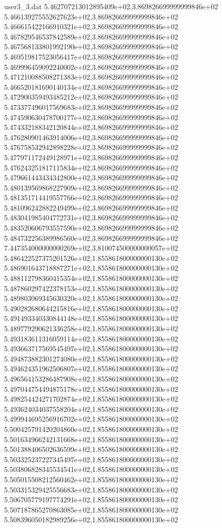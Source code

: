 \begin{filecontents}{user3_3.dat}
5.462707213012895409e+02,3.869826699999999846e+02
5.466139275552627623e+02,3.869826699999999846e+02
5.466615422166910321e+02,3.869826699999999846e+02
5.467829546537842589e+02,3.869826699999999846e+02
5.467568133801992190e+02,3.869826699999999846e+02
5.469519817523056417e+02,3.869826699999999846e+02
5.469996459092240002e+02,3.869826699999999846e+02
5.471210088508271383e+02,3.869826699999999846e+02
5.466520181690140134e+02,3.869826699999999846e+02
5.472900359493485212e+02,3.869826699999999846e+02
5.473377496017569683e+02,3.869826699999999846e+02
5.474590630478700177e+02,3.869826699999999846e+02
5.474332188342120844e+02,3.869826699999999846e+02
5.476280901463914006e+02,3.869826699999999846e+02
5.476758532942898228e+02,3.869826699999999846e+02
5.477971172449128971e+02,3.869826699999999846e+02
5.476243251817115834e+02,3.869826699999999846e+02
5.479661443434342800e+02,3.869826699999999846e+02
5.480139569868227909e+02,3.869826699999999846e+02
5.481351714419557766e+02,3.869826699999999846e+02
5.481096242882249499e+02,3.869826699999999846e+02
5.483041985404772731e+02,3.869826699999999846e+02
5.483520606793557590e+02,3.869826699999999846e+02
5.484732256389986560e+02,3.869826699999999846e+02
7.447354000000000269e+02,3.810074500000000057e+02
5.486422527375201526e+02,1.855861800000000130e+02
5.486901643718887271e+02,1.855861800000000130e+02
5.488112798360415354e+02,1.855861800000000130e+02
5.487860297422378153e+02,1.855861800000000130e+02
5.489803069345630320e+02,1.855861800000000130e+02
5.490282680644215816e+02,1.855861800000000130e+02
5.491493340330844148e+02,1.855861800000000130e+02
5.489779290621336258e+02,1.855861800000000130e+02
5.493183611316059114e+02,1.855861800000000130e+02
5.493663717569545497e+02,1.855861800000000130e+02
5.494873882301274080e+02,1.855861800000000130e+02
5.494624351962506807e+02,1.855861800000000130e+02
5.496564153286487908e+02,1.855861800000000130e+02
5.497044754494875178e+02,1.855861800000000130e+02
5.498254424271702874e+02,1.855861800000000130e+02
5.493624034037558204e+02,1.855861800000000130e+02
5.499944695256916702e+02,1.855861800000000130e+02
5.500425791420204860e+02,1.855861800000000130e+02
5.501634966242131668e+02,1.855861800000000130e+02
5.501388406502636599e+02,1.855861800000000130e+02
5.503325237227345497e+02,1.855861800000000130e+02
5.503806828345534541e+02,1.855861800000000130e+02
5.505015508212560462e+02,1.855861800000000130e+02
5.503315329425556683e+02,1.855861800000000130e+02
5.506705779197774291e+02,1.855861800000000130e+02
5.507187865270863085e+02,1.855861800000000130e+02
5.508396050182989256e+02,1.855861800000000130e+02

\end{filecontents}
